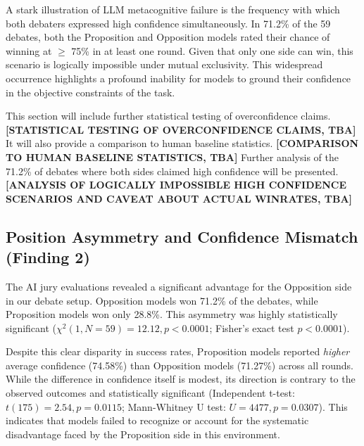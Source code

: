 \documentclass{article}
\begin{document}
A stark illustration of LLM metacognitive failure is the frequency with which both debaters expressed high confidence simultaneously. In 71.2\% of the 59 debates, both the Proposition and Opposition models rated their chance of winning at $\ge$ 75\% in at least one round. Given that only one side can win, this scenario is logically impossible under mutual exclusivity. This widespread occurrence highlights a profound inability for models to ground their confidence in the objective constraints of the task.

This section will include further statistical testing of overconfidence claims. \textbf{[STATISTICAL TESTING OF OVERCONFIDENCE CLAIMS, TBA]}
It will also provide a comparison to human baseline statistics. \textbf{[COMPARISON TO HUMAN BASELINE STATISTICS, TBA]}
Further analysis of the 71.2\% of debates where both sides claimed high confidence will be presented. \textbf{[ANALYSIS OF LOGICALLY IMPOSSIBLE HIGH CONFIDENCE SCENARIOS AND CAVEAT ABOUT ACTUAL WINRATES, TBA]}

\subsection{Position Asymmetry and Confidence Mismatch (Finding 2)}

The AI jury evaluations revealed a significant advantage for the Opposition side in our debate setup. Opposition models won 71.2\% of the debates, while Proposition models won only 28.8\%. This asymmetry was highly statistically significant ($\chi^2(1, N=59) = 12.12, p < 0.0001$; Fisher's exact test $p < 0.0001$).

Despite this clear disparity in success rates, Proposition models reported \textit{higher} average confidence (74.58\%) than Opposition models (71.27\%) across all rounds. While the difference in confidence itself is modest, its direction is contrary to the observed outcomes and statistically significant (Independent t-test: $t(175) = 2.54, p = 0.0115$; Mann-Whitney U test: $U=4477, p = 0.0307$). This indicates that models failed to recognize or account for the systematic disadvantage faced by the Proposition side in this environment.
\end{document}

